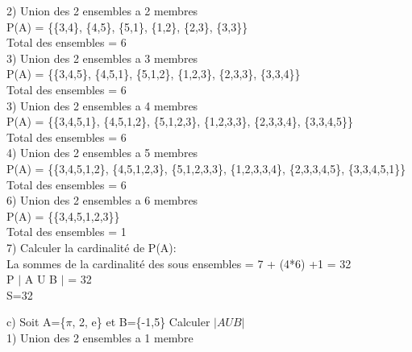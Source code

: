 2) Union des 2 ensembles a 2 membres \\

P(A) = \{\{3,4\}, \{4,5\}, \{5,1\}, \{1,2\}, \{2,3\}, \{3,3\}\} \\

Total des ensembles = 6 \\

3) Union des 2 ensembles a 3 membres \\

P(A) = \{\{3,4,5\}, \{4,5,1\}, \{5,1,2\}, \{1,2,3\}, \{2,3,3\}, \{3,3,4\}\} \\

Total des ensembles =  6 \\

3) Union des 2 ensembles a 4 membres \\

P(A) = \{\{3,4,5,1\}, \{4,5,1,2\}, \{5,1,2,3\}, \{1,2,3,3\}, \{2,3,3,4\}, \{3,3,4,5\}\} \\

Total des ensembles = 6 \\

4) Union des 2 ensembles a 5 membres \\

P(A) = \{\{3,4,5,1,2\}, \{4,5,1,2,3\}, \{5,1,2,3,3\}, \{1,2,3,3,4\}, \{2,3,3,4,5\}, \{3,3,4,5,1\}\} \\

Total des ensembles = 6 \\

6) Union des 2 ensembles a 6 membres \\

P(A) = \{\{3,4,5,1,2,3\}\} \\

Total des ensembles = 1 \\

7) Calculer la cardinalité de P(A):\\

La sommes de la cardinalité des sous ensembles = 7 + (4*6) +1 = 32\\

P $|$ A U B $|$ = 32 \\

S=32 \\

\newpage

c) Soit A=\{$\pi$, 2, e\} et B=\{-1,5\} Calculer $|A U B|$ \\

1) Union des 2 ensembles a 1 membre \\

